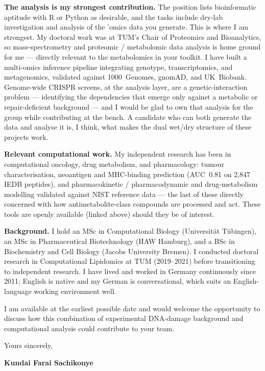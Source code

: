 \documentclass[12pt,a4paper]{article}
\begin{document}
\textbf{The analysis is my strongest contribution.}
The position lists bioinformatic aptitude with R or Python as desirable, and the
tasks include dry-lab investigation and analysis of the ’omics data you
generate. This is where I am strongest. My doctoral work was at TUM's Chair of
Proteomics and Bioanalytics, so mass-spectrometry and proteomic / metabolomic
data analysis is home ground for me --- directly relevant to the metabolomics in
your toolkit. I have built a multi-omics inference pipeline integrating
genotype, transcriptomics, and metagenomics, validated against 1000~Genomes,
gnomAD, and UK~Biobank. Genome-wide CRISPR screens, at the analysis layer, are a
genetic-interaction problem --- identifying the dependencies that emerge only
against a metabolic or repair-deficient background --- and I would be glad to
own that analysis for the group while contributing at the bench. A candidate who
can both generate the data and analyse it is, I think, what makes the dual
wet/dry structure of these projects work.

\textbf{Relevant computational work.}
My independent research has been in computational oncology, drug metabolism, and
pharmacology: tumour characterisation, neoantigen and MHC-binding prediction
(AUC~0.81 on 2{,}847 IEDB peptides), and pharmacokinetic / pharmacodynamic and
drug-metabolism modelling validated against NIST reference data --- the last of
these directly concerned with how antimetabolite-class compounds are processed
and act. These tools are openly available (linked above) should they be of
interest.

\textbf{Background.}
I hold an MSc in Computational Biology (Universit\"at T\"ubingen), an MSc in
Pharmaceutical Biotechnology (HAW Hamburg), and a BSc in Biochemistry and Cell
Biology (Jacobs University Bremen). I conducted doctoral research in
Computational Lipidomics at TUM (2019--2021) before transitioning to independent
research. I have lived and worked in Germany continuously since 2011; English is
native and my German is conversational, which suits an English-language working
environment well.

I am available at the earliest possible date and would welcome the opportunity
to discuss how this combination of experimental DNA-damage background and
computational analysis could contribute to your team.

\vspace{1.5em}
Yours sincerely,

\vspace{2.5em}
\textbf{Kundai Farai Sachikonye}
\end{document}
